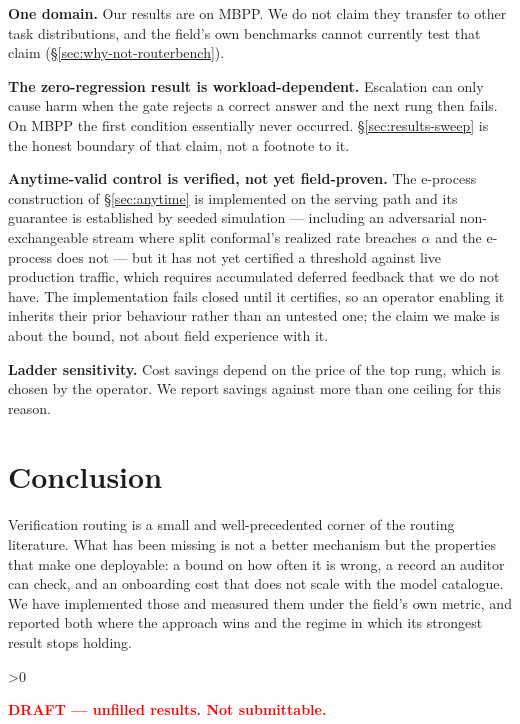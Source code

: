 \documentclass[11pt]{article}
\newcounter{todocount}
\newcommand{\fillcheck}{%
  \ifnum\value{todocount}>0
    \begin{center}\textcolor{red}{\textbf{DRAFT --- \arabic{todocount} unfilled results.
    Not submittable.}}\end{center}
  \fi}
\begin{document}
\textbf{One domain.} Our results are on MBPP. We do not claim they transfer to other task
distributions, and the field's own benchmarks cannot currently test that claim
(\S\ref{sec:why-not-routerbench}).

\textbf{The zero-regression result is workload-dependent.} Escalation can only cause harm when the
gate rejects a correct answer and the next rung then fails. On MBPP the first condition essentially
never occurred. \S\ref{sec:results-sweep} is the honest boundary of that claim, not a footnote to
it.

\textbf{Anytime-valid control is verified, not yet field-proven.} The e-process construction of
\S\ref{sec:anytime} is implemented on the serving path and its guarantee is established by seeded
simulation --- including an adversarial non-exchangeable stream where split conformal's realized rate
breaches $\alpha$ and the e-process does not --- but it has not yet certified a threshold against
live production traffic, which requires accumulated deferred feedback that we do not have. The
implementation fails closed until it certifies, so an operator enabling it inherits their prior
behaviour rather than an untested one; the claim we make is about the bound, not about field
experience with it.

\textbf{Ladder sensitivity.} Cost savings depend on the price of the top rung, which is chosen by
the operator. We report savings against more than one ceiling for this reason.

\section{Conclusion}

Verification routing is a small and well-precedented corner of the routing literature. What has been
missing is not a better mechanism but the properties that make one deployable: a bound on how often
it is wrong, a record an auditor can check, and an onboarding cost that does not scale with the
model catalogue. We have implemented those and measured them under the field's own metric, and
reported both where the approach wins and the regime in which its strongest result stops holding.

\fillcheck
\end{document}
